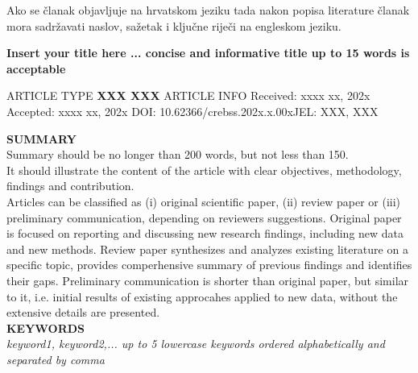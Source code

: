 \documentclass{crebsshr}
\renewcommand\doinumber{10.62366/crebss.202x.x.00x}
\renewcommand\JEL{XXX, XXX}
\begin{document}
	\bigskip
	\bigskip

\noindent Ako se članak objavljuje na hrvatskom jeziku tada nakon popisa literature članak mora sadržavati naslov, sažetak i ključne riječi na engleskom jeziku.

\begin{center}
	\large  \bf Insert your title here ... {\color{red}concise and informative title up to 15 words is acceptable}
\end{center}

\begin{minipage}[b]{\dimexpr0.32\textwidth-1\fboxrule-0.5\fboxsep\relax}
	ARTICLE TYPE \newline
	\rm\small \textbf{XXX XXX} \newline \newline \newline
	ARTICLE INFO \newline
	Received: xxxx xx, 202x \newline Accepted: xxxx xx, 202x \newline DOI: \doinumber \newline JEL: \JEL  \newline \newline \newline
\end{minipage}%
\begin{minipage}[b]{0.68\textwidth}
	\vspace{0.2cm}  \textbf{SUMMARY} \\
		{\color{red} Summary should be no longer than 200 words, but not less than 150. \\ It should illustrate the content of the article with clear objectives, methodology, findings and contribution. \\ Articles can be classified as (i) original scientific paper, (ii) review paper or (iii) preliminary communication, depending on reviewers suggestions.} Original paper is focused on reporting and discussing new research findings, including new data and new methods. Review paper synthesizes and analyzes existing literature on a specific topic, provides comperhensive summary of previous findings and identifies their gaps. Preliminary communication is shorter than original paper, but similar to it, i.e. initial results of existing approcahes applied to new data, without the extensive details are presented. \smallskip \\
	\textbf{KEYWORDS} \\ {\it keyword1, keyword2,... {\color{red}up to 5 lowercase keywords ordered alphabetically and separated by comma}}

\end{minipage}
\end{document}
